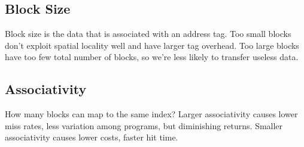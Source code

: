 \subsection{Block Size}
Block size is the data that is associated with an address tag. Too small blocks don't exploit spatial locality well and have larger tag overhead. Too large blocks have too few total number of blocks, so we're less likely to transfer useless data.

\subsection{Associativity}
How many blocks can map to the same index? Larger associativity causes lower miss rates, less variation among programs, but diminishing returns. Smaller associativity causes lower costs, faster hit time.

\newpage